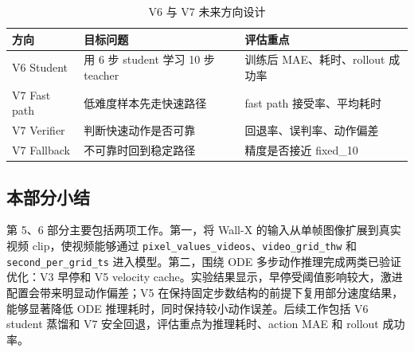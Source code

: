 \documentclass[UTF8,a4paper,12pt]{ctexart}
\begin{document}
\begin{table}[H]
\centering
\small
\caption{V6 与 V7 未来方向设计}
\begin{tabular}{lll}
\toprule
方向 & 目标问题 & 评估重点 \\
\midrule
V6 Student & 用 6 步 student 学习 10 步 teacher & 训练后 MAE、耗时、rollout 成功率 \\
V7 Fast path & 低难度样本先走快速路径 & fast path 接受率、平均耗时 \\
V7 Verifier & 判断快速动作是否可靠 & 回退率、误判率、动作偏差 \\
V7 Fallback & 不可靠时回到稳定路径 & 精度是否接近 fixed\_10 \\
\bottomrule
\end{tabular}
\end{table}

\subsection{本部分小结}

第 5、6 部分主要包括两项工作。第一，将 Wall-X 的输入从单帧图像扩展到真实视频 clip，使视频能够通过 \texttt{pixel\_values\_videos}、\texttt{video\_grid\_thw} 和 \texttt{second\_per\_grid\_ts} 进入模型。第二，围绕 ODE 多步动作推理完成两类已验证优化：V3 早停和 V5 velocity cache。实验结果显示，早停受阈值影响较大，激进配置会带来明显动作偏差；V5 在保持固定步数结构的前提下复用部分速度结果，能够显著降低 ODE 推理耗时，同时保持较小动作误差。后续工作包括 V6 student 蒸馏和 V7 安全回退，评估重点为推理耗时、action MAE 和 rollout 成功率。
\end{document}
